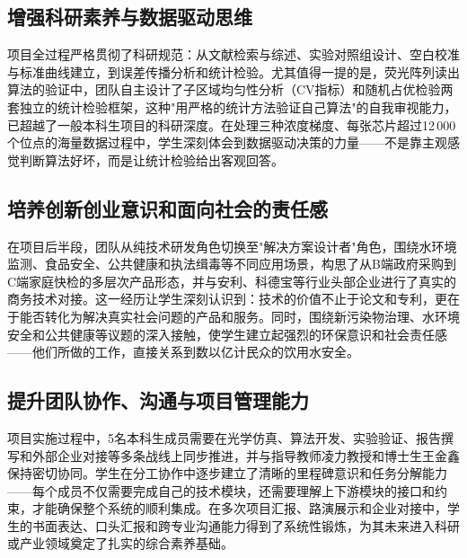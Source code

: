 \documentclass[12pt,a4paper]{article}
\begin{document}
\subsection{增强科研素养与数据驱动思维}

项目全过程严格贯彻了科研规范：从文献检索与综述、实验对照组设计、空白校准与标准曲线建立，到误差传播分析和统计检验。尤其值得一提的是，荧光阵列读出算法的验证中，团队自主设计了子区域均匀性分析（CV指标）和随机占优检验两套独立的统计检验框架，这种"用严格的统计方法验证自己算法"的自我审视能力，已超越了一般本科生项目的科研深度。在处理三种浓度梯度、每张芯片超过12\,000个位点的海量数据过程中，学生深刻体会到数据驱动决策的力量——不是靠主观感觉判断算法好坏，而是让统计检验给出客观回答。

\subsection{培养创新创业意识和面向社会的责任感}

在项目后半段，团队从纯技术研发角色切换至"解决方案设计者"角色，围绕水环境监测、食品安全、公共健康和执法缉毒等不同应用场景，构思了从B端政府采购到C端家庭快检的多层次产品形态，并与安利、科德宝等行业头部企业进行了真实的商务技术对接。这一经历让学生深刻认识到：技术的价值不止于论文和专利，更在于能否转化为解决真实社会问题的产品和服务。同时，围绕新污染物治理、水环境安全和公共健康等议题的深入接触，使学生建立起强烈的环保意识和社会责任感——他们所做的工作，直接关系到数以亿计民众的饮用水安全。

\subsection{提升团队协作、沟通与项目管理能力}

项目实施过程中，5名本科生成员需要在光学仿真、算法开发、实验验证、报告撰写和外部企业对接等多条战线上同步推进，并与指导教师凌力教授和博士生王金鑫保持密切协同。学生在分工协作中逐步建立了清晰的里程碑意识和任务分解能力——每个成员不仅需要完成自己的技术模块，还需要理解上下游模块的接口和约束，才能确保整个系统的顺利集成。在多次项目汇报、路演展示和企业对接中，学生的书面表达、口头汇报和跨专业沟通能力得到了系统性锻炼，为其未来进入科研或产业领域奠定了扎实的综合素养基础。
\end{document}
